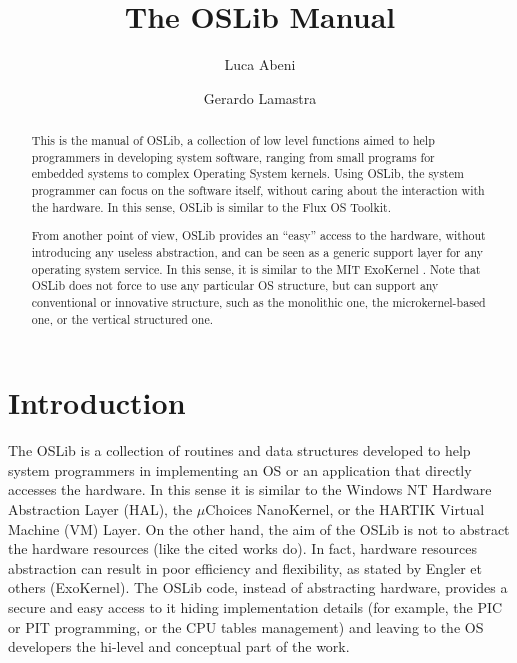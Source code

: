 \documentclass[a4paper]{report}
\title{The OSLib Manual}
\author{Luca Abeni
\and
	Gerardo Lamastra
}
\begin{document}
\setlength{\baselineskip}{1.5\baselineskip}
\maketitle
\begin{abstract}
This is the manual of OSLib, a collection of low level functions aimed
to help programmers in developing system software, ranging from small
programs for embedded systems to complex Operating System
kernels. Using OSLib, the system programmer can focus on the software
itself, without caring about the interaction with the hardware.  In
this sense, OSLib is similar to the Flux OS Toolkit.

From another point of view, OSLib provides an ``easy'' access to the
hardware, without introducing any useless abstraction, and can be seen
as a generic support layer for any operating system service. In this
sense, it is similar to the MIT ExoKernel .  Note that OSLib does not
force to use any particular OS structure, but can support any
conventional or innovative structure, such as the monolithic one, the
microkernel-based one, or the vertical structured one.
\end{abstract}

\chapter{Introduction}
The OSLib is a collection of routines and data structures developed to
help system programmers in implementing an OS or an application that
directly accesses the hardware. In this sense it is
similar to the Windows NT Hardware Abstraction Layer (HAL), the
$\mu$Choices NanoKernel, or the HARTIK Virtual Machine (VM) Layer. On
the other hand, the aim of the OSLib is not to abstract the
hardware resources (like the cited works do).  In fact, hardware
resources abstraction can result in poor efficiency and flexibility,
as stated by Engler et others (ExoKernel). The OSLib code, instead of
abstracting hardware, provides a secure and easy access to it hiding
implementation details (for example, the PIC or PIT programming, or the
CPU tables management)
and leaving to the OS developers the hi-level and conceptual part of
the work.
\end{document}
